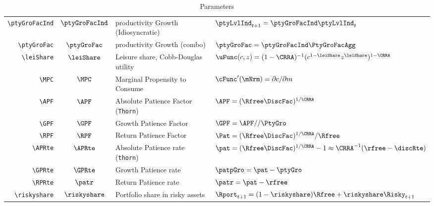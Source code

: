 \documentclass[12pt]{\econtex}
\begin{document}
\begin{table}[ht]
\begin{tabular}{|>{\ttfamily}rcll|}
    \\ \verb|\ptyGroFacInd|  & $\ptyGroFacInd$ & productivity Growth (Idiosyncratic) & $\ptyLvlInd_{t+1} = \ptyGroFacInd \ptyLvlInd_{t}$
    \\ \verb|\ptyGroFac|  & $\ptyGroFac$ & productivity Growth (combo) & $\ptyGroFac = \ptyGroFacInd \PtyGroFacAgg$
    \\ \verb|\leiShare|  & $\leiShare$ & Leisure share, Cobb-Douglas utility & $\uFunc(c,z)=(1-\CRRA)^{-1}(c^{1-\leiShare}z^{\leiShare})^{1-\CRRA}$
    \\ \verb|\MPC|  & $\MPC$ & Marginal Propensity to Consume & $\cFunc^{\prime}(\mNrm)=\partial c/\partial m$
    \\ \verb|\APF|  & $\APF$ & Absolute Patience Factor (\texttt{Thorn}) & $\APF = (\Rfree \DiscFac)^{1/\CRRA} $
    \\ \verb|\GPF| & $\GPF$ & Growth Patience Factor & $\GPF = \APF//\PtyGro $
    \\ \verb|\RPF| & $\RPF$ & Return Patience Factor & $\Pat = (\Rfree \DiscFac)^{1/\CRRA}/\Rfree $ 
    \\ \verb|\APRte|  & $\APRte$ & Absolute Patience rate (\texttt{thorn}) & $\pat = (\Rfree \DiscFac)^{1/\CRRA}-1 \approx \CRRA^{-1}(\rfree-\discRte) $
    \\ \verb|\GPRte| & $\GPRte$ & Growth Patience rate  & $\patpGro = \pat -\ptyGro $
    \\ \verb|\RPRte| & $\patr$ & Return Patience rate  & $\patr =\pat -\rfree $
    \\ \verb|\riskyshare|  & $\riskyshare$ & Portfolio share in risky assets & $\Rport_{t+1}=(1-\riskyshare)\Rfree+\riskyshare\Risky_{t+1}$
    \\	\hline
  \end{tabular}
  \caption{Parameters}
  \label{table:Parameters}
\end{table}	
\end{document}

